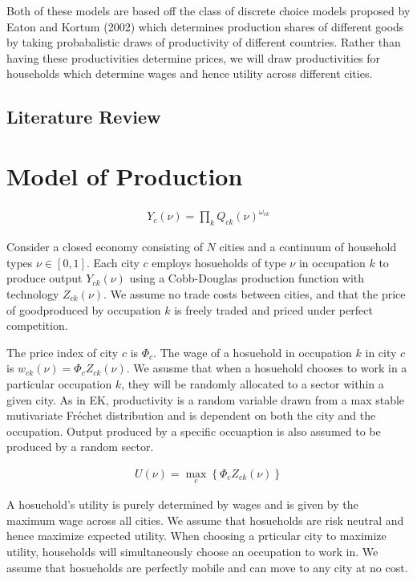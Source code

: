 \documentclass[10pt]{article}
\begin{document}
Both of these models are based off the class of discrete choice models proposed by Eaton and Kortum (2002) which determines production shares of different goods by taking probabalistic draws of productivity of different countries. Rather than having these productivities determine prices, we will draw productivities for households which determine wages and hence utility across different cities.

\subsection{Literature Review}

\section{Model of Production}

\begin{align}
    Y_{c} (\nu) = \prod_k Q_{ck} (\nu)^{\omega_{ck}}
\end{align}

Consider a closed economy consisting of $N$ cities and a continuum of household types $\nu \in [0, 1]$. Each city $c$ employs hosueholds of type $\nu$ in occupation $k$ to produce output $Y_{ck} (\nu)$ using a Cobb-Douglas production function with technology $Z_{ck} (\nu)$. We assume no trade costs between cities, and that the price of goodproduced by occupation $k$ is freely traded and priced under perfect competition.

The price index of city $c$ is $\Phi_c$. The wage of a hosuehold in occupation $k$ in city $c$ is $w_{ck} (\nu) = \Phi_c Z_{ck} (\nu)$. We asusme that when a hosuehold chooses to work in a particular occupation $k$, they will be randomly allocated to a sector within a given city. As in EK, productivity is a random variable drawn from a max stable mutivariate Fr\'{e}chet distribution and is dependent on both the city and the occupation. Output produced by a specific occuaption is also assumed to be produced by a random sector.

\begin{align}
    U (\nu) = \max_c \left\{ \Phi_c Z_{ck} (\nu) \right\}
\end{align}

A hosuehold's utility is purely determined by wages and is given by the maximum wage across all cities. We assume that hosueholds are risk neutral and hence maximize expected utility. When choosing a prticular city to maximize utility, households will simultaneously choose an occupation to work in. We assume that hosueholds are perfectly mobile and can move to any city at no cost.
\end{document}
